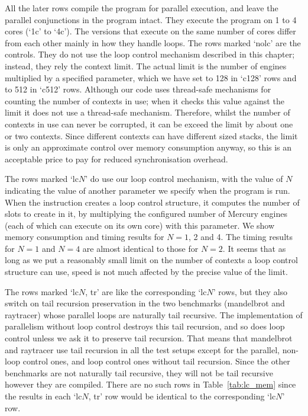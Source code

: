 All the later rows
compile the program for parallel execution,
and leave the parallel conjunctions in the program intact.
They execute the program on 1 to 4 cores (`1c' to `4c').
The versions that execute on the same number of cores
differ from each other mainly in how they handle loops.
The rows marked `nolc' are the controls.
They do not use the loop control mechanism described in this chapter;
instead, they rely the context limit.
The actual limit is the number of engines
multiplied by a specified parameter,
which we have set to 128 in `c128' rows and to 512 in `c512' rows.
Although our code uses thread-safe mechanisms for counting the number of
contexts in use;
when it checks this value against the limit it does not use a thread-safe
mechanism.
Therefore, whilst the number of contexts in use can never be corrupted,
it can be exceed the limit by about one or two contexts.
Since different contexts can have different sized stacks,
the limit is only an approximate control over memory consumption anyway,
so this is an acceptable price to pay for reduced synchronisation overhead.

The rows marked `lc$N$' do use our loop control mechanism,
with the value of $N$ indicating
the value of another parameter we specify when the program is run.
When the  instruction
creates a loop control structure,
it computes the number of slots to create in it,
by multiplying the configured number of Mercury engines
(each of which can execute on its own core)
with this parameter.
We show memory consumption and timing results for $N=1$, 2 and 4.
The timing results for $N=1$ and $N=4$ are almost identical to those for
$N=2$.
It seems that as long as we put a reasonably small limit
on the number of contexts a loop control structure can use,
speed is not much affected by the precise value of the limit.

The rows marked `lc$N$, tr' are like the corresponding `lc$N$' rows,
but they also switch on tail recursion preservation
in the two benchmarks (mandelbrot and raytracer)
whose parallel loops are naturally tail recursive.
The implementation of parallelism without loop control
destroys this tail recursion,
and so does loop control unless we ask it to preserve tail recursion.
That means that mandelbrot and raytracer use tail recursion
in all the test setups except for
the parallel, non-loop control ones,
and loop control ones without tail recursion.
Since the other benchmarks are not naturally tail recursive,
they will not be tail recursive however they are compiled.
There are no such rows in Table~\ref{tab:lc_mem}
since the results in each `lc$N$, tr' row
would be identical to the corresponding `lc$N$' row.

